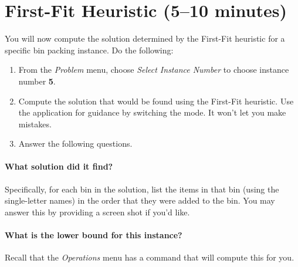 \documentclass[11pt,letterpaper]{article}
\begin{document}
\newpage

\section{First-Fit Heuristic (5--10 minutes)}\label{sec:ff}


You will now compute the solution determined by the First-Fit
heuristic for a specific bin packing instance. Do the following:
\begin{enumerate}[leftmargin=*, parsep=0pt, itemsep=2pt, topsep=2pt]
\item From the {\em Problem} menu, choose {\em Select Instance Number}
to choose instance number \textbf{5}.
\item Compute the solution that would be found using the First-Fit 
heuristic. Use the application for guidance by switching the mode.
It won't let you make mistakes.
\item Answer the following questions.
\end{enumerate}

\paragraph*{What solution did it find?} Specifically, for each bin in the
solution, list the items in that bin (using the single-letter names) in the
order that they were added to the bin. You may answer this by providing a
screen shot if you'd like.

\vspace*{2in}

\paragraph*{What is the lower bound for this instance?} Recall that the
{\em Operations} menu has a command that will compute this for you.
\end{document}
